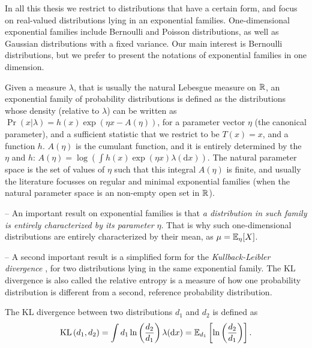 In all this thesis we restrict to distributions that have a certain form, and focus on real-valued distributions lying in an exponential families.
One-dimensional exponential families include Bernoulli and Poisson distributions, as well as Gaussian distributions with a fixed variance.
Our main interest is Bernoulli distributions, but we prefer to present the notations of exponential families in one dimension.

Given a measure $\lambda$, that is usually the natural Lebesgue measure on $\mathbb{R}$, an exponential family of probability distributions is defined as the distributions whose density (relative to $\lambda$) can be written as
$ \Pr(x | \lambda) = h(x) \exp \left( \eta x - A(\eta) \right)$,
for a parameter vector $\eta$ (the canonical parameter), and a sufficient statistic that we restrict to be $T(x)=x$, and a function $h$.
$A(\eta)$ is the cumulant function, and it is entirely determined by the $\eta$ and $h$:
$A(\eta) = \log \left( \int h(x) \exp(\eta x) \lambda(\mathrm{d} x) \right)$.
%
The natural parameter space is the set of values of $\eta$ such that this integral $A(\eta)$ is finite,
and usually the literature focusses on regular and minimal exponential families (when the natural parameter space is an non-empty open set in $\mathbb{R}$).

-- An important result on exponential families is that \emph{a distribution in such family is entirely characterized by its parameter $\eta$}.
That is why such one-dimensional distributions are entirely characterized by their mean, as $\mu = \mathbb{E}_{\eta}[X]$.

-- A second important result is a simplified form for the \emph{Kullback-Leibler divergence} \cite{KullbackLeibler51}, for two distributions lying in the same exponential family.
The KL divergence is also called the relative entropy is a measure of how one probability distribution is different from a second, reference probability distribution.

\begin{defn}\label{def:2:KLDivergence}
    The KL divergence between two distributions $d_1$ and $d_2$ is defined as
    \begin{equation}\label{eq:2:Kullback-LeiblerDivergenceExpFamily1}
        \mathrm{KL}\left(d_1, d_2\right) = \int d_1 \ln\left(\frac{d_2}{d_1}\right) \lambda(\mathrm{d}x) = \mathbb{E}_{d_1} \left[ \ln\left(\frac{d_2}{d_1}\right) \right].
    \end{equation}
\end{defn}


